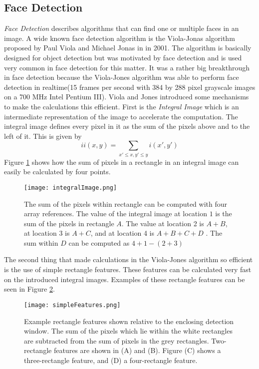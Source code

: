 \subsection{Face Detection}\label{ssec:faceDetection}
\emph{Face Detection} describes algorithms that can find one or multiple faces in an image.
A wide known face detection algorithm is the Viola-Jonas algorithm proposed by Paul Viola and Michael Jonas in \cite{Viola01rapidobject} in 2001. 
The algorithm is basically designed for object detection but was motivated by face detection and is used very common in face detection for this matter.
It was a rather big breakthrough in face detection because the Viola-Jones algorithm was able to perform face detection in realtime(15 frames per second with 384 by 288 pixel grayscale images on a 700 MHz Intel Pentium III).
Viola and Jones introduced some mechanisms to make the calculations this efficient. 
First is the \emph{Integral Image} which is an intermediate representation of the image to accelerate the computation.
The integral image defines every pixel in it as the sum of the pixels above and to the left of it.
This is given by
\begin{equation}\label{eq:integralImage}
ii(x, y) = \sum_{x' \leq x, y' \leq y} i(x', y')
\end{equation}
Figure \ref{fig:integralImage} shows how the sum of pixels in a rectangle in an integral image can easily be calculated by four points.
\begin{figure}
  \centering
  \texttt{[image: integralImage.png]}
  \caption{The sum of the pixels within rectangle  can be
computed with four array references. The value of the integral image at location $1$ is the sum of the pixels in rectangle $A$. The value at location 2 is $A+B$, at location 3 is $A+C$,
and at location 4 is $A+B+C+D$ . The sum within $D$ can
be computed as $4+1-(2+3)$ \cite{Viola01rapidobject}}
  \label{fig:integralImage}
\end{figure}
The second thing that made calculations in the Viola-Jones algorithm so efficient is the use of simple rectangle features.
These features can be calculated very fast on the introduced integral images.
Examples of these rectangle features can be seen in Figure \ref{fig:simpleFeatures}.
\begin{figure}
  \centering
  \texttt{[image: simpleFeatures.png]}
  \caption{Example rectangle features shown relative to the
enclosing detection window. The sum of the pixels which
lie within the white rectangles are subtracted from the sum
of pixels in the grey rectangles. Two-rectangle features are
shown in (A) and (B). Figure (C) shows a three-rectangle
feature, and (D) a four-rectangle feature. \cite{Viola01rapidobject}}
  \label{fig:simpleFeatures}
\end{figure}
